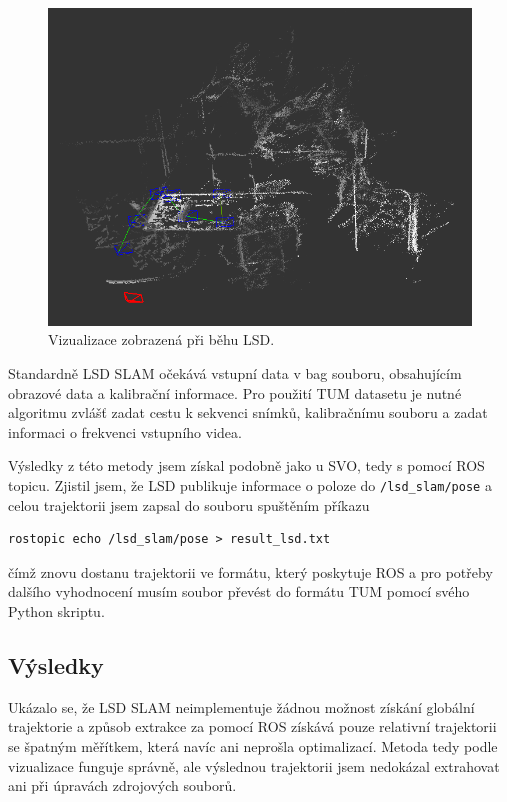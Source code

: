 \documentclass[12pt,a4paper]{report}
\begin{document}
\begin{figure}[H]
\centering
\includegraphics[scale=0.6]{img/LSD_run.png}
\caption{Vizualizace zobrazená při běhu LSD.}
\label{lsd_run}
\end{figure} 

Standardně LSD SLAM očekává vstupní data v bag souboru, obsahujícím obrazové data a kalibrační informace. Pro použití TUM datasetu je nutné algoritmu zvlášť zadat cestu k sekvenci snímků, kalibračnímu souboru a zadat informaci o frekvenci vstupního videa.

Výsledky z této metody jsem získal podobně jako u SVO, tedy s pomocí ROS topicu. Zjistil jsem, že LSD publikuje informace o poloze do \texttt{/lsd\_slam/pose} a celou trajektorii jsem zapsal do souboru spuštěním příkazu
\begin{verbatim}
rostopic echo /lsd_slam/pose > result_lsd.txt
\end{verbatim}
čímž znovu dostanu trajektorii ve formátu, který poskytuje ROS a pro potřeby dalšího vyhodnocení musím soubor převést do formátu TUM pomocí svého Python skriptu.

\subsection*{Výsledky}
Ukázalo se, že LSD SLAM neimplementuje žádnou možnost získání globální trajektorie a způsob extrakce za pomocí ROS získává pouze relativní trajektorii se špatným měřítkem, která navíc ani neprošla optimalizací. Metoda tedy podle vizualizace funguje správně, ale výslednou trajektorii jsem nedokázal extrahovat ani při úpravách zdrojových souborů.
\end{document}
